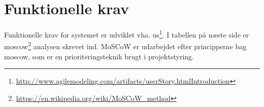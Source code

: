 \section{Funktionelle krav}
Funktionelle krav for systemet er udviklet vha. \gls{us}\footnote{\url{http://www.agilemodeling.com/artifacts/userStory.htmlIntroduction}}.
I tabellen på næste side er \gls{moscow}\footnote{\url{https://en.wikipedia.org/wiki/MoSCoW_method}} analysen skrevet ind. MoSCoW er udarbejdet efter principperne bag \gls{moscow}, som er en prioriteringsteknik brugt i projektstyring.

%
